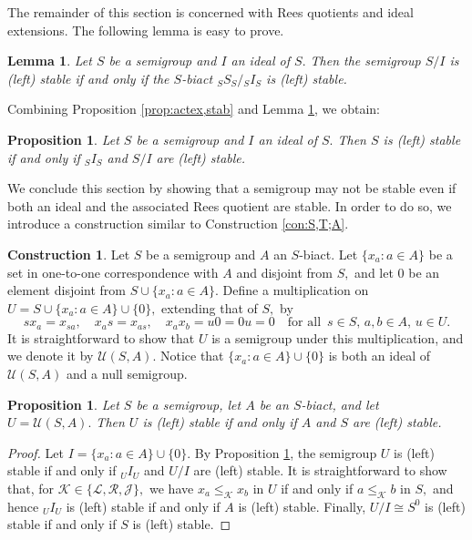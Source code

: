 \documentclass[twoside,a4paper,12pt,reqno]{amsart}
\theoremstyle{plain}
\newtheorem{lem}[thm]{Lemma}
\newtheorem{prop}[thm]{Proposition}
\theoremstyle{definition}
\newtheorem{con}[thm]{Construction}
\renewcommand{\l}{\mbox{${\mathcal{L}}$}}
\renewcommand{\r}{\mbox{${\mathcal{R}}$}}
\renewcommand{\j}{\mbox{${\mathcal{J}}$}}
\renewcommand{\k}{\mbox{${\mathcal{K}}$}}
\newcommand{\leqk}{\leq_{\mathcal{K}}}
\newcommand{\U}{\mathcal{U}}
\begin{document}
The remainder of this section is concerned with Rees quotients and ideal extensions.  The following lemma is easy to prove.

\begin{lem}\label{lem:RQ,stab}
Let $S$ be a semigroup and $I$ an ideal of $S.$  Then the semigroup $S/I$ is (left) stable if and only if the $S$-biact ${_S}S_S/{_S}I_S$ is (left) stable.
\end{lem}

Combining Proposition \ref{prop:actex,stab} and Lemma \ref{lem:RQ,stab}, we obtain:

\begin{prop}\label{prop:sgpex,stab}
Let $S$ be a semigroup and $I$ an ideal of $S.$  Then $S$ is (left) stable if and only if ${_S}I_S$ and $S/I$ are (left) stable.
\end{prop}

We conclude this section by showing that a semigroup may not be stable even if both an ideal and the associated Rees quotient are stable.  In order to do so, we introduce a construction similar to Construction \ref{con:S,T;A}.

\begin{con}\label{con}
Let $S$ be a semigroup and $A$ an $S$-biact.  Let $\{x_a : a\in A\}$ be a set in one-to-one correspondence with $A$ and disjoint from $S,$ and let $0$ be an element disjoint from $S\cup\{x_a : a\in A\}.$  Define a multiplication on $U=S\cup\{x_a : a\in A\}\cup\{0\},$ extending that of $S,$ by
$$sx_a=x_{sa},\quad x_as=x_{as},\quad x_ax_b=u0=0u=0\quad\text{for all }\,s\in S,\,a,b\in A,\,u\in U.$$  
It is straightforward to show that $U$ is a semigroup under this multiplication, and we denote it by $\U(S,A).$  Notice that $\{x_a : a\in A\}\cup\{0\}$ is both an ideal of $\U(S,A)$ and a null semigroup.
\end{con}

\begin{prop}\label{prop:con}
Let $S$ be a semigroup, let $A$ be an $S$-biact, and let $U=\U(S,A).$  Then $U$ is (left) stable if and only if $A$ and $S$ are (left) stable.
\end{prop}

\begin{proof}
Let $I=\{x_a : a\in A\}\cup\{0\}.$  By Proposition \ref{prop:sgpex,stab}, the semigroup $U$ is (left) stable if and only if ${_U}I_U$ and $U/I$ are (left) stable.  It is straightforward to show that, for $\k\in\{\l,\r,\j\},$ we have $x_a\leqk x_b$ in $U$ if and only if $a\leqk b$ in $S,$ and hence ${_U}I_U$ is (left) stable if and only if $A$ is (left) stable.  Finally, $U/I\cong S^0$ is (left) stable if and only if $S$ is (left) stable.
\end{proof}
\end{document}
